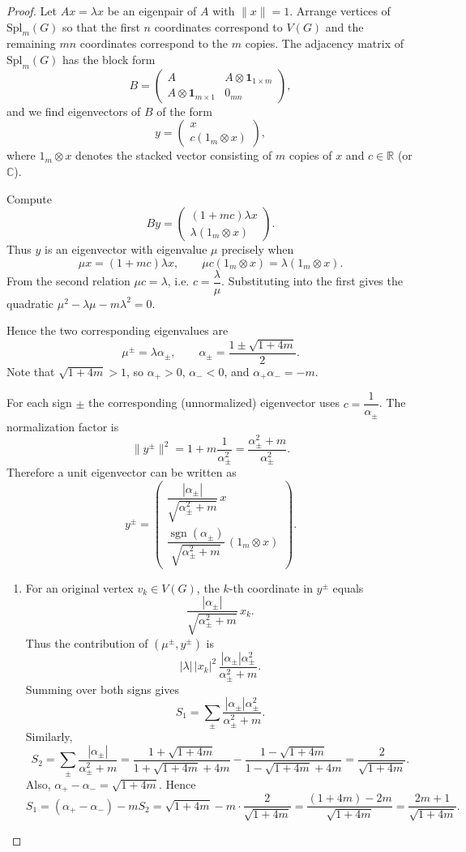 \documentclass[12pt]{article}
\theoremstyle{plain}
\theoremstyle{remark}
\theoremstyle{definition}
\begin{document}
\begin{proof}
	Let $A x=\lambda x$ be an eigenpair of $A$ with $\|x\|=1$. Arrange vertices of $\mathrm{Spl}_m(G)$ so that the first $n$ coordinates correspond to $V(G)$ and the remaining $mn$ coordinates correspond to the $m$ copies. The adjacency matrix of $\mathrm{Spl}_m(G)$ has the block form
	$$B=\begin{pmatrix}
		A & A\otimes \mathbf{1}_{1\times m}\\[4pt]
		A\otimes \mathbf{1}_{m\times 1} & 0_{mn}
	\end{pmatrix},$$
	and we find eigenvectors of $B$ of the form
	$$y=\begin{pmatrix}
		x \\ c(1_m\otimes x)
	\end{pmatrix},$$
	where $1_m\otimes x$ denotes the stacked vector consisting of $m$ copies of $x$ and $c\in\mathbb{R}$ (or $\mathbb{C}$).
	
	Compute
	$$B y
	=
	\begin{pmatrix}
		(1+m c)\lambda x \\[4pt]
		\lambda(1_m\otimes x)
	\end{pmatrix}.$$
	Thus $y$ is an eigenvector with eigenvalue $\mu$ precisely when
	$$\mu x=(1+m c)\lambda x,\qquad \mu c(1_m\otimes x)=\lambda(1_m\otimes x).$$
	From the second relation $\mu c=\lambda$, i.e. $c=\dfrac{\lambda}{\mu}$. Substituting into the first gives the quadratic
	$\mu^2-\lambda\mu-m\lambda^2=0.$
	
	Hence the two corresponding eigenvalues are
	$$\mu^\pm=\lambda\alpha_\pm,\qquad \alpha_\pm=\frac{1\pm\sqrt{1+4m}}{2}.$$
	Note that $\sqrt{1+4m}>1$, so $\alpha_+>0$, $\alpha_-<0$, and $\alpha_+\alpha_-=-m$.
	
	For each sign $\pm$ the corresponding (unnormalized) eigenvector uses $c=\dfrac{1}{\alpha_\pm}$. The normalization factor is
	$$\|y^\pm\|^2=1+m\frac{1}{\alpha_\pm^2}=\frac{\alpha_\pm^2+m}{\alpha_\pm^2}.$$
	Therefore a unit eigenvector can be written as
	$$y^\pm=\begin{pmatrix}
		\dfrac{|\alpha_\pm|}{\sqrt{\alpha_\pm^2+m}}\, x \\[6pt]
		\dfrac{\operatorname{sgn}(\alpha_\pm)}{\sqrt{\alpha_\pm^2+m}}\,(1_m\otimes x)
	\end{pmatrix}.$$
	\begin{enumerate}
		\item 	For an original vertex $v_k\in V(G)$, the $k$-th coordinate in $y^\pm$ equals $$\dfrac{|\alpha_\pm|}{\sqrt{\alpha_\pm^2+m}}\,x_k.$$ Thus the contribution of $(\mu^\pm,y^\pm)$ is
		$$|\lambda|\,|x_k|^2\, \frac{|\alpha_\pm|\alpha_\pm^2}{\alpha_\pm^2+m}.$$
		Summing over both signs gives
		$$S_1=\sum_{\pm}\frac{|\alpha_\pm|\alpha_\pm^2}{\alpha_\pm^2+m}.$$
		Similarly,
		$$S_2=\sum_{\pm}\frac{|\alpha_\pm|}{\alpha_\pm^2+m}
		=\frac{1+\sqrt{1+4m}}{1+\sqrt{1+4m}+4m}
		-\frac{1-\sqrt{1+4m}}{1-\sqrt{1+4m}+4m}
		=\frac{2}{\sqrt{1+4m}}.$$
		Also,
		$\alpha_+-\alpha_-=\sqrt{1+4m}.$
		Hence
		$$S_1=(\alpha_+-\alpha_-)-mS_2
		=\sqrt{1+4m}-m\cdot\frac{2}{\sqrt{1+4m}}
		=\frac{(1+4m)-2m}{\sqrt{1+4m}}
		=\frac{2m+1}{\sqrt{1+4m}}.$$
		

\end{enumerate}
\end{proof}
\end{document}
